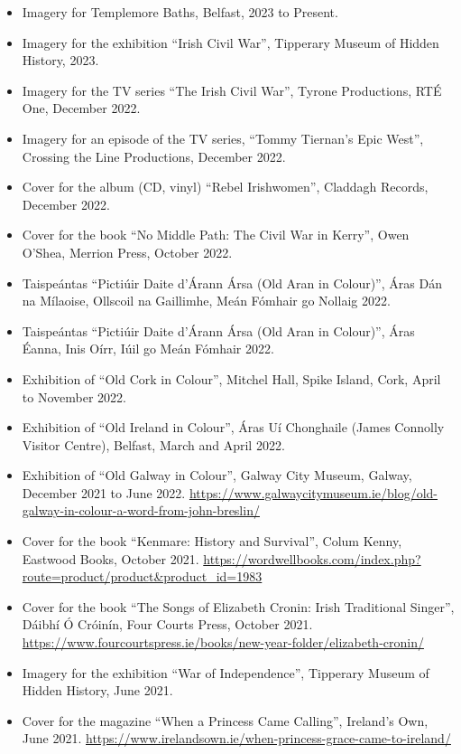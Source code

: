 \documentclass[10pt,a4paper]{res} %
\begin{document}
\begin{resume}
\begin{itemize}
\item Imagery for Templemore Baths, Belfast, 2023 to Present.
\item Imagery for the exhibition ``Irish Civil War'', Tipperary Museum of Hidden History, 2023.
\item Imagery for the TV series ``The Irish Civil War'', Tyrone Productions, RT\'{E} One, December 2022.
\item Imagery for an episode of the TV series, ``Tommy Tiernan's Epic West'', Crossing the Line Productions, December 2022.
\item Cover for the album (CD, vinyl) ``Rebel Irishwomen'', Claddagh Records, December 2022.
\item Cover for the book ``No Middle Path: The Civil War in Kerry'', Owen O'Shea, Merrion Press, October 2022.
\item Taispe\'{a}ntas ``Picti\'{u}ir Daite d'\'{A}rann \'{A}rsa (Old Aran in Colour)'', \'{A}ras D\'{a}n na M\'{i}laoise, Ollscoil na Gaillimhe, Me\'{a}n F\'{o}mhair go Nollaig 2022.
\item Taispe\'{a}ntas ``Picti\'{u}ir Daite d'\'{A}rann \'{A}rsa (Old Aran in Colour)'', \'{A}ras \'{E}anna, Inis O\'{i}rr, I\'{uil} go Me\'{a}n F\'{o}mhair 2022.
\item Exhibition of ``Old Cork in Colour'', Mitchel Hall, Spike Island, Cork, April to November 2022.
\item Exhibition of ``Old Ireland in Colour'', \'{A}ras U\'{i} Chonghaile (James Connolly Visitor Centre), Belfast, March and April 2022.
\item Exhibition of ``Old Galway in Colour'', Galway City Museum, Galway, December 2021 to June 2022. \url{https://www.galwaycitymuseum.ie/blog/old-galway-in-colour-a-word-from-john-breslin/}
\item Cover for the book ``Kenmare: History and Survival'', Colum Kenny, Eastwood Books, October 2021. \url{https://wordwellbooks.com/index.php?route=product/product&product_id=1983}
\item Cover for the book ``The Songs of Elizabeth Cronin: Irish Traditional Singer'', D\'{a}ibh\'{i} \'{O} Cr\'{o}in\'{i}n, Four Courts Press, October 2021. \url{https://www.fourcourtspress.ie/books/new-year-folder/elizabeth-cronin/}
\item Imagery for the exhibition ``War of Independence'', Tipperary Museum of Hidden History, June 2021.
\item Cover for the magazine ``When a Princess Came Calling'', Ireland's Own, June 2021. \url{https://www.irelandsown.ie/when-princess-grace-came-to-ireland/} 

\end{itemize}
\end{resume}
\end{document}

